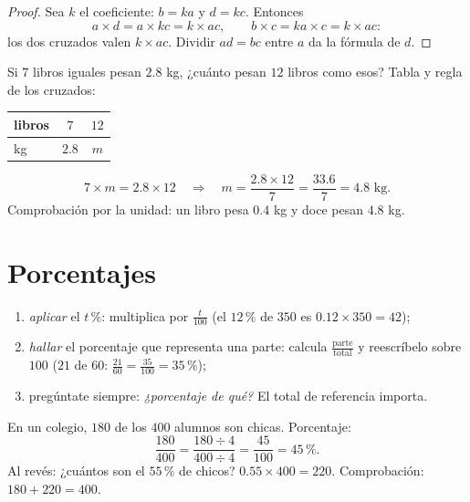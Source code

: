 \begin{proof}
Sea $k$ el coeficiente: $b = ka$ y $d = kc$. Entonces
\[
a \times d = a \times kc = k \times ac,
\qquad
b \times c = ka \times c = k \times ac :
\]
los dos  cruzados valen $k \times ac$. Dividir $ad = bc$ entre $a$
da la fórmula de $d$.
\end{proof}

\begin{example}\label{ex:g7:prop:fourth}
Si $7$ libros iguales pesan $2.8$ kg, ¿cuánto pesan $12$ libros
como esos? Tabla y regla de los  cruzados:
\begin{center}
\renewcommand{\arraystretch}{1.3}
\begin{tabular}{l|cc}
libros & $7$ & $12$ \\
\hline
kg & $2.8$ & $m$ \\
\end{tabular}
\end{center}
\[
7 \times m = 2.8 \times 12
\quad\Longrightarrow\quad
m = \frac{2.8 \times 12}{7} = \frac{33.6}{7} = 4.8 \text{ kg}.
\]
Comprobación por la unidad: un libro pesa $0.4$ kg y doce pesan $4.8$ kg.
\end{example}

\section{Porcentajes}

\begin{method}\label{met:g7:prop:percent}
\begin{enumerate}
  \item \emph{aplicar} el $t\,\%$: multiplica por $\frac{t}{100}$
        (el $12\,\%$ de $350$ es $0.12 \times 350 = 42$);
  \item \emph{hallar} el porcentaje que representa una parte: calcula
        $\frac{\text{parte}}{\text{total}}$ y reescríbelo sobre $100$
        ($21$ de $60$: $\frac{21}{60} = \frac{35}{100} = 35\,\%$);
  \item pregúntate siempre: \emph{¿porcentaje de qué?} El total de referencia
        importa.
\end{enumerate}
\end{method}

\begin{example}\label{ex:g7:prop:percent}
En un colegio, $180$ de los $400$ alumnos son chicas. Porcentaje:
\[
\frac{180}{400} = \frac{180 \div 4}{400 \div 4} = \frac{45}{100}
= 45\,\% .
\]
Al revés: ¿cuántos son el $55\,\%$ de chicos?
$0.55 \times 400 = 220$. Comprobación: $180 + 220 = 400$.
\end{example}

